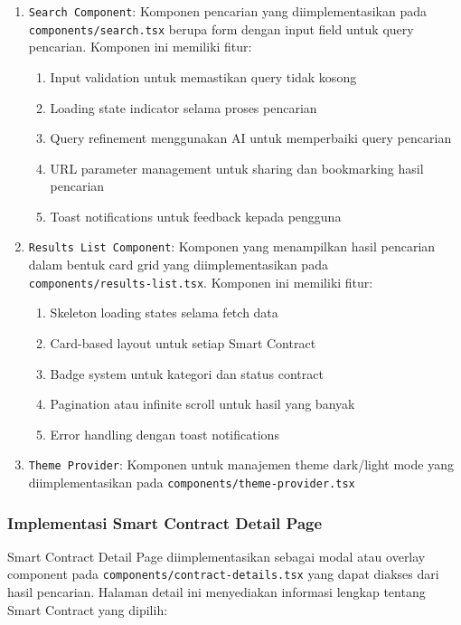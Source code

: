 \begin{enumerate}
    \item \texttt{Search Component}: Komponen pencarian yang diimplementasikan pada \texttt{components/search.tsx} berupa form dengan input field untuk query pencarian. Komponen ini memiliki fitur:
    \begin{enumerate}
        \item Input validation untuk memastikan query tidak kosong
        \item Loading state indicator selama proses pencarian
        \item Query refinement menggunakan AI untuk memperbaiki query pencarian
        \item URL parameter management untuk sharing dan bookmarking hasil pencarian
        \item Toast notifications untuk feedback kepada pengguna
    \end{enumerate}
    \item \texttt{Results List Component}: Komponen yang menampilkan hasil pencarian dalam bentuk card grid yang diimplementasikan pada \\\texttt{components/results-list.tsx}. Komponen ini memiliki fitur:
    \begin{enumerate}
        \item Skeleton loading states selama fetch data
        \item Card-based layout untuk setiap Smart Contract
        \item Badge system untuk kategori dan status contract
        \item Pagination atau infinite scroll untuk hasil yang banyak
        \item Error handling dengan toast notifications
    \end{enumerate}
    \item \texttt{Theme Provider}: Komponen untuk manajemen theme dark/light mode yang diimplementasikan pada \texttt{components/theme-provider.tsx}
\end{enumerate}

\subsubsection{Implementasi Smart Contract Detail Page}

Smart Contract Detail Page diimplementasikan sebagai modal atau overlay component pada \texttt{components/contract-details.tsx} yang dapat diakses dari hasil pencarian. Halaman detail ini menyediakan informasi lengkap tentang Smart Contract yang dipilih:

